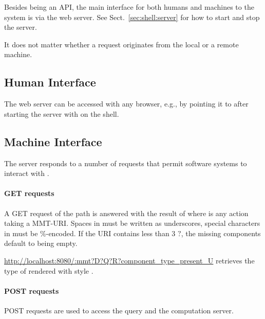 Besides being an API, the main interface for both humans and machines to the {\mmt} system is via the web server. See Sect.~\ref{sec:shell:server} for how to start and stop the server.

It does not matter whether a request originates from the local or a remote machine.

\subsection{Human Interface}

The {\mmt} web server can be accessed with any browser, e.g., by pointing it to  after starting the server with  on the shell.

\subsection{Machine Interface}

The server responds to a number of requests that permit software systems to interact with {\mmt}.

\paragraph{GET requests}
A GET request of the path  is answered with the result of  where  is any action taking a MMT-URI. Spaces in  must be written as underscores, special characters in  must be \%-encoded.
If the URI contains less than $3$ $?$, the missing components default to being empty.

\begin{example}
\url{http://localhost:8080/:mmt?D?Q?R?component_type_present_U}
retrieves the type of  rendered with style .
\end{example}

\paragraph{POST requests}
POST requests are used to access the query \cite{rabe:querying:12} and the computation server.